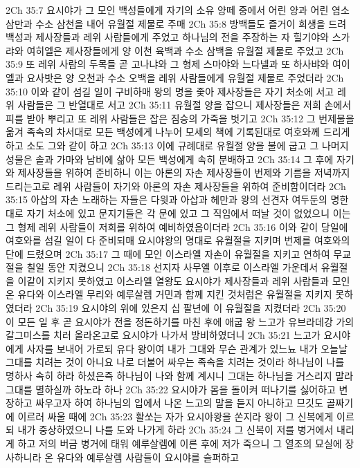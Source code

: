 2Ch 35:7  요시야가 그 모인 백성들에게 자기의 소유 양떼 중에서 어린 양과 어린 염소 삼만과 수소 삼천을 내어 유월절 제물로 주매
2Ch 35:8  방백들도 즐거이 희생을 드려 백성과 제사장들과 레위 사람들에게 주었고 하나님의 전을 주장하는 자 힐기야와 스가랴와 여히엘은 제사장들에게 양 이천 육백과 수소 삼백을 유월절 제물로 주었고
2Ch 35:9  또 레위 사람의 두목들 곧 고나냐와 그 형제 스마야와 느다넬과 또 하사뱌와 여이엘과 요사밧은 양 오천과 수소 오백을 레위 사람들에게 유월절 제물로 주었더라
2Ch 35:10  이와 같이 섬길 일이 구비하매 왕의 명을 좇아 제사장들은 자기 처소에 서고 레위 사람들은 그 반열대로 서고
2Ch 35:11  유월절 양을 잡으니 제사장들은 저희 손에서 피를 받아 뿌리고 또 레위 사람들은 잡은 짐승의 가죽을 벗기고
2Ch 35:12  그 번제물을 옮겨 족속의 차서대로 모든 백성에게 나누어 모세의 책에 기록된대로 여호와께 드리게 하고 소도 그와 같이 하고
2Ch 35:13  이에 규례대로 유월절 양을 불에 굽고 그 나머지 성물은 솥과 가마와 남비에 삶아 모든 백성에게 속히 분배하고
2Ch 35:14  그 후에 자기와 제사장들을 위하여 준비하니 이는 아론의 자손 제사장들이 번제와 기름을 저녁까지 드리는고로 레위 사람들이 자기와 아론의 자손 제사장들을 위하여 준비함이더라
2Ch 35:15  아삽의 자손 노래하는 자들은 다윗과 아삽과 헤만과 왕의 선견자 여두둔의 명한대로 자기 처소에 있고 문지기들은 각 문에 있고 그 직임에서 떠날 것이 없었으니 이는 그 형제 레위 사람들이 저희를 위하여 예비하였음이더라
2Ch 35:16  이와 같이 당일에 여호와를 섬길 일이 다 준비되매 요시야왕의 명대로 유월절을 지키며 번제를 여호와의 단에 드렸으며
2Ch 35:17  그 때에 모인 이스라엘 자손이 유월절을 지키고 연하여 무교절을 칠일 동안 지켰으니
2Ch 35:18  선지자 사무엘 이후로 이스라엘 가운데서 유월절을 이같이 지키지 못하였고 이스라엘 열왕도 요시야가 제사장들과 레위 사람들과 모인 온 유다와 이스라엘 무리와 예루살렘 거민과 함께 지킨 것처럼은 유월절을 지키지 못하였더라
2Ch 35:19  요시야의 위에 있은지 십 팔년에 이 유월절을 지켰더라
2Ch 35:20  이 모든 일 후 곧 요시야가 전을 정돈하기를 마친 후에 애굽 왕 느고가 유브라데강 가의 갈그미스를 치러 올라온고로 요시야가 나가서 방비하였더니
2Ch 35:21  느고가 요시야에게 사자를 보내어 가로되 유다 왕이여 내가 그대와 무슨 관계가 있느뇨 내가 오늘날 그대를 치려는 것이 아니요 나로 더불어 싸우는 족속을 치려는 것이라 하나님이 나를 명하사 속히 하라 하셨은즉 하나님이 나와 함께 계시니 그대는 하나님을 거스리지 말라 그대를 멸하실까 하노라 하나
2Ch 35:22  요시야가 몸을 돌이켜 떠나기를 싫어하고 변장하고 싸우고자 하여 하나님의 입에서 나온 느고의 말을 듣지 아니하고 므깃도 골짜기에 이르러 싸울 때에
2Ch 35:23  활쏘는 자가 요시야왕을 쏜지라 왕이 그 신복에게 이르되 내가 중상하였으니 나를 도와 나가게 하라
2Ch 35:24  그 신복이 저를 병거에서 내리게 하고 저의 버금 병거에 태워 예루살렘에 이른 후에 저가 죽으니 그 열조의 묘실에 장사하니라 온 유다와 예루살렘 사람들이 요시야를 슬퍼하고
